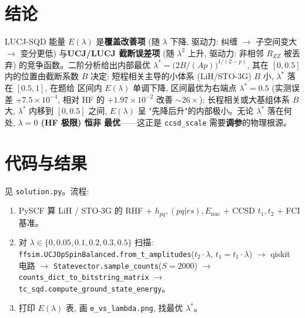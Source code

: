 \documentclass[11pt]{article}
\begin{document}
\section*{结论}
LUCJ-SQD 能量 $E(\lambda)$ 是\textbf{覆盖改善项} (随 $\lambda$ 下降, 驱动力: 纠缠
$\to$ 子空间变大 $\to$ 变分更低) 与\textbf{UCJ/LUCJ 截断误差项} (随 $\lambda^2$ 上升,
驱动力: 非相邻 $R_{ZZ}$ 被丢弃) 的竞争函数。二阶分析给出内部最优
$\lambda^\ast=\big(2B/(Ap)\big)^{1/(2-p)}$, 其在 $[0,0.5]$ 内的位置由截断系数 $B$
决定: 短程相关主导的小体系 (LiH/STO-3G) $B$ 小, $\lambda^\ast$ 落在 $[0.5,1]$, 在题给
区间内 $E(\lambda)$ 单调下降, 区间最优为右端点 $\lambda^\ast=0.5$ (实测误差
$+7.5{\times}10^{-4}$, 相对 HF 的 $+1.97{\times}10^{-2}$ 改善 $\sim 26\times$);
长程相关或大基组体系 $B$ 大, $\lambda^\ast$ 内移到 $[0,0.5]$ 之间, $E(\lambda)$ 呈
"先降后升"的内部极小。无论 $\lambda^\ast$ 落在何处, \textbf{$\lambda=0$ (HF 极限) 恒非
最优}——这正是 \texttt{ccsd\_scale} 需要\textbf{调参}的物理根源。

\section*{代码与结果}
见 \texttt{solution.py}。流程:
\begin{enumerate}
  \item PySCF 算 LiH / STO-3G 的 RHF + $h_{pq},(pq|rs),E_{\text{nuc}}$ + CCSD $t_1,t_2$ + FCI 基准。
  \item 对 $\lambda\in\{0,0.05,0.1,0.2,0.3,0.5\}$ 扫描:
        \texttt{ffsim.UCJOpSpinBalanced.from\_t\_amplitudes}($t_2\!\cdot\!\lambda,\,t_1=t_1\!\cdot\!\lambda$)
        $\to$ qiskit 电路 $\to$ \texttt{Statevector.sample\_counts}($S{=}2000$)
        $\to$ \texttt{counts\_dict\_to\_bitstring\_matrix} $\to$
        \texttt{tc\_sqd.compute\_ground\_state\_energy}。
  \item 打印 $E(\lambda)$ 表, 画 \texttt{e\_vs\_lambda.png}, 找最优 $\lambda^\ast$。
\end{enumerate}
\end{document}
